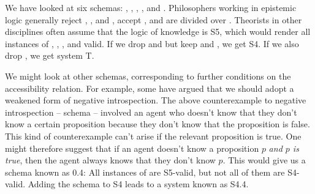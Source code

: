 

We have looked at six schemas: , , , , and .
Philosophers working in epistemic logic generally reject , , and
, accept , and are divided over . Theorists in other
disciplines often assume that the logic of knowledge is S5, which would render
all instances of , , , and  valid. If we drop  and
 but keep  and , we get S4. If we also drop , we get
system T.

We might look at other schemas, corresponding to further conditions on the
accessibility relation. For example, some have argued that we should adopt a
weakened form of negative introspection. The above counterexample to negative
introspection -- schema  -- involved an agent who doesn't know that they
don't know a certain proposition because they don't know that the proposition is
false. This kind of counterexample can't arise if the relevant proposition is
true. One might therefore suggest that if an agent doesn't know a proposition
$p$ \emph{and $p$ is true}, then the agent always knows that they don't know
$p$. This would give us a schema known as 0.4:
%
%
All instances of  are S5-valid, but not all of them are S4-valid. Adding
the  schema to S4 leads to a system known as S4.4.


